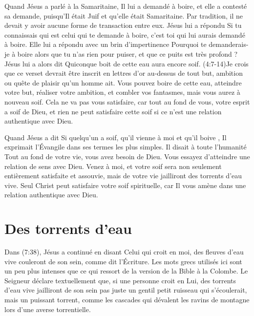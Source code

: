 Quand Jésus a parlé à la Samaritaine, Il lui a demandé à boire,
 et elle a contesté sa demande, puisqu'Il était Juif
 et qu'elle était Samaritaine. Par tradition, il ne devait y avoir
 aucune forme de transaction entre eux. Jésus lui a répondu\frcolon{}
 \Og Si tu connaissais qui est celui qui te demande à boire,
 c'est toi qui lui aurais demandé à boire. \Fg{}
 Elle lui a répondu avec un brin d'impertinence\frcolon{}
 \Og Pourquoi te demanderais-je à boire alors que tu n'as rien pour puiser,
 et que ce puits est très profond ? \Fg{} Jésus lui a alors dit\frcolon{}
 \Og Quiconque boit de cette eau aura encore soif. \Fg{}
 (4:7-14)Je crois que ce verset devrait être inscrit
 \Og en lettres d'or \Fg{} au-dessus de tout but,
 ambition ou quête de plaisir qu'un homme ait.
 Vous pouvez boire de cette eau, atteindre votre but, réaliser votre ambition,
 et combler vos fantasmes, mais vous aurez à nouveau soif.
 Cela ne va pas vous satisfaire, car tout au fond de vous,
 votre esprit a soif de Dieu, et rien ne peut satisfaire cette soif
 si ce n'est une relation authentique avec Dieu.

Quand Jésus a dit\frcolon{} \Og Si quelqu'un a soif, qu'il vienne à moi
 et qu'il boive \Fg{}, Il exprimait l'Évangile dans ses termes
 les plus simples. Il disait à toute l'humanité\frcolon{}
 \Og Tout au fond de votre vie, vous avez besoin de Dieu.
 Vous essayez d'atteindre une relation de sens avec Dieu.
 Venez à moi, et votre soif sera non seulement entièrement satisfaite
 et assouvie, mais de votre vie jailliront des torrents d'eau vive. \Fg{}
 Seul Christ peut satisfaire votre soif spirituelle,
 car Il vous amène dans une relation authentique avec Dieu.


\section{Des torrents d'eau}

Dans (7:38), Jésus a continué en disant\frcolon{}
 \Og Celui qui croit en moi, des fleuves d'eau vive couleront de son sein,
 comme dit l'Écriture. \Fg{}
 Les mots grecs utilisés ici sont un peu plus intenses que ce qui ressort
 de la version de la Bible à la Colombe. Le Seigneur déclare textuellement
 que, si une personne croit en Lui, \Og des torrents d'eau vive jailliront
 de son sein \Fg{} \ocadr pas juste un gentil petit ruisseau qui s'écoulerait,
 mais un puissant torrent, comme les cascades qui dévalent les ravins de montagne
 lors d'une averse torrentielle.

